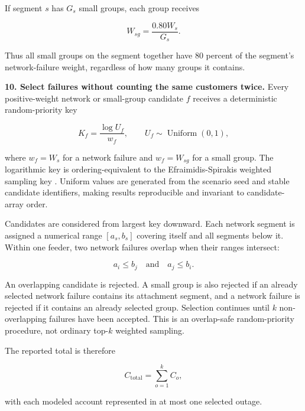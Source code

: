 \documentclass[11pt]{article}
\begin{document}
If segment $s$ has $G_s$ small groups, each group receives

\begin{equation}
  W_{sg}=\frac{0.80W_s}{G_s}.
  \label{eq:group-weight}
\end{equation}

Thus all small groups on the segment together have 80 percent of the segment's network-failure weight, regardless of how many groups it contains.

\textbf{10. Select failures without counting the same customers twice.}
Every positive-weight network or small-group candidate $f$ receives a deterministic random-priority key

\begin{equation}
  K_f=\frac{\log U_f}{w_f},
  \qquad U_f\sim\operatorname{Uniform}(0,1),
  \label{eq:failure-key}
\end{equation}

where $w_f=W_s$ for a network failure and $w_f=W_{sg}$ for a small group. The logarithmic key is ordering-equivalent to the Efraimidis-Spirakis weighted sampling key \citep{efraimidis2006}. Uniform values are generated from the scenario seed and stable candidate identifiers, making results reproducible and invariant to candidate-array order.

Candidates are considered from largest key downward. Each network segment is assigned a numerical range $[a_s,b_s]$ covering itself and all segments below it. Within one feeder, two network failures overlap when their ranges intersect:

\begin{equation}
  a_i\le b_j
  \quad\text{and}\quad
  a_j\le b_i.
  \label{eq:overlap}
\end{equation}

An overlapping candidate is rejected. A small group is also rejected if an already selected network failure contains its attachment segment, and a network failure is rejected if it contains an already selected group. Selection continues until $k$ non-overlapping failures have been accepted. This is an overlap-safe random-priority procedure, not ordinary top-$k$ weighted sampling.

The reported total is therefore

\begin{equation}
  C_{\mathrm{total}}=\sum_{o=1}^{k}C_o,
  \label{eq:total-customers}
\end{equation}

with each modeled account represented in at most one selected outage.
\end{document}
